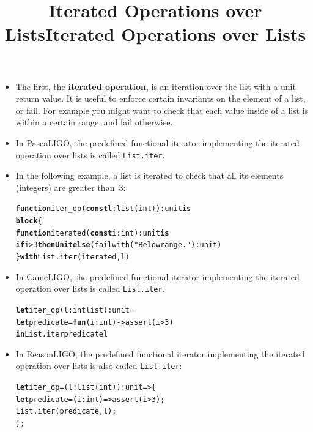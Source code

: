 \documentclass[wide]{slides}
\newcommand{\Kblock}[0]{\textbf{block}\xspace}
\newcommand{\Kconst}[0]{\textbf{const}\xspace}
\newcommand{\Kelse}[0]{\textbf{else}\xspace}
\newcommand{\Kfunction}[0]{\textbf{function}\xspace}
\newcommand{\Kif}[0]{\textbf{if}\xspace}
\newcommand{\Kin}[0]{\textbf{in}\xspace}
\newcommand{\Kis}[0]{\textbf{is}\xspace}
\newcommand{\Kthen}[0]{\textbf{then}\xspace}
\newcommand{\KUnit}[0]{\textbf{Unit}\xspace}
\newcommand{\Kwith}[0]{\textbf{with}\xspace}
\newcommand{\Kfun}[0]{\textbf{fun}\xspace}
\newcommand{\Klet}[0]{\textbf{let}\xspace}
\begin{document}
\begin{slide}
  \title{Iterated Operations over Lists}

  \begin{itemize}

    \item The first, the \textbf{iterated operation}, is an iteration
      over the list with a unit return value. It is useful to enforce
      certain invariants on the element of a list, or fail. For
      example you might want to check that each value inside of a list
      is within a certain range, and fail otherwise.

    \item In PascaLIGO, the predefined functional iterator
      implementing the iterated operation over lists is called
      \texttt{List.iter}.

    \item In the following example, a list is iterated to check that
      all its elements (integers) are greater than~\(3\):
      \begin{alltt}
\Kfunction iter_op (\Kconst l : list (int)) : unit \Kis
  \Kblock \{
    \Kfunction iterated (\Kconst i : int) : unit \Kis
      \Kif i > 3 \Kthen \KUnit \Kelse (failwith ("Below range.") : unit)
  \} \Kwith List.iter (iterated, l)
      \end{alltt}

  \end{itemize}

\end{slide}

\begin{slide}
  \title{Iterated Operations over Lists}

  \begin{itemize}

    \item In CameLIGO, the predefined functional iterator implementing
      the iterated operation over lists is called \texttt{List.iter}.
      \begin{alltt}
\Klet iter_op (l : int list) : unit =
  \Klet predicate = \Kfun (i : int) -> assert (i > 3)
  \Kin List.iter predicate l
      \end{alltt}

    \item In ReasonLIGO, the predefined functional iterator
      implementing the iterated operation over lists is also called
      \texttt{List.iter}:
      \begin{alltt}
\Klet iter_op = (l : list (int)) : unit => \{
  \Klet predicate = (i : int) => assert (i > 3);
  List.iter (predicate, l);
\};
      \end{alltt}

  \end{itemize}

\end{slide}
\end{document}
